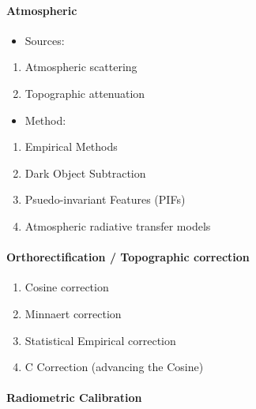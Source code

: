 \documentclass[
  letterpaper,
  DIV=11,
  numbers=noendperiod]{scrreprt}
\let\oldparagraph\paragraph
\renewcommand{\paragraph}[1]{\oldparagraph{#1}\mbox{}}
\providecommand{\tightlist}{%
  \setlength{\itemsep}{0pt}\setlength{\parskip}{0pt}}\usepackage{longtable,booktabs,array}
\begin{document}
\hypertarget{atmospheric}{%
\paragraph{Atmospheric}\label{atmospheric}}

\begin{itemize}
\tightlist
\item
  Sources:
\end{itemize}

\begin{enumerate}
\def\labelenumi{\arabic{enumi}.}
\tightlist
\item
  Atmospheric scattering
\item
  Topographic attenuation
\end{enumerate}

\begin{itemize}
\tightlist
\item
  Method:
\end{itemize}

\begin{enumerate}
\def\labelenumi{\arabic{enumi}.}
\tightlist
\item
  Empirical Methods
\item
  Dark Object Subtraction
\item
  Psuedo-invariant Features (PIFs)
\item
  Atmospheric radiative transfer models
\end{enumerate}

\hypertarget{orthorectification-topographic-correction}{%
\paragraph{Orthorectification / Topographic
correction}\label{orthorectification-topographic-correction}}

\begin{enumerate}
\def\labelenumi{\arabic{enumi}.}
\tightlist
\item
  Cosine correction
\item
  Minnaert correction
\item
  Statistical Empirical correction
\item
  C Correction (advancing the Cosine)
\end{enumerate}

\hypertarget{radiometric-calibration}{%
\paragraph{Radiometric Calibration}\label{radiometric-calibration}}
\end{document}
